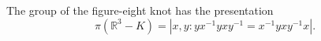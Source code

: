 The group of the figure-eight knot has the presentation
$$\pi(\mathbb{R}^3 - K) = |x, y : yx^{-1}yxy^{-1} = x^{-1}yxy^{-1}x|.$$
